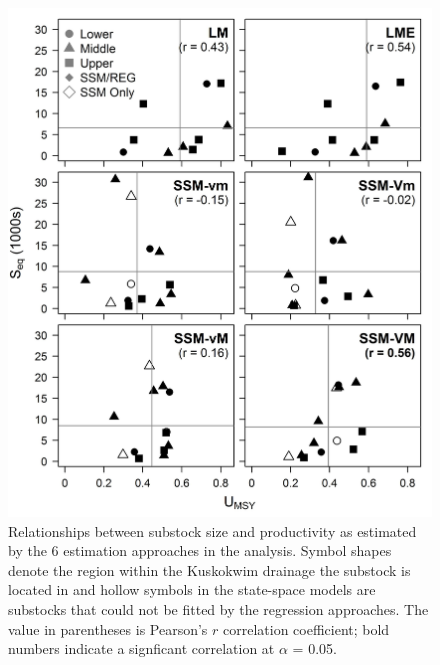 \documentclass[12pt,]{book}
\theoremstyle{definition}
\theoremstyle{definition}
\theoremstyle{definition}
\theoremstyle{remark}
\begin{document}
\begin{figure}
  \centering
  \includegraphics{img/Ch4/Size-v-Prod.jpg}
  \caption{Relationships between substock size and productivity as estimated by the 6 estimation approaches in the analysis. Symbol shapes denote the region within the Kuskokwim drainage the substock is located in and hollow symbols in the state-space models are substocks that could not be fitted by the regression approaches. The value in parentheses is Pearson's $r$ correlation coefficient; bold numbers indicate a signficant correlation at $\alpha$ = 0.05.}
  \label{fig:size-v-prod}
\end{figure}

\clearpage
\end{document}
